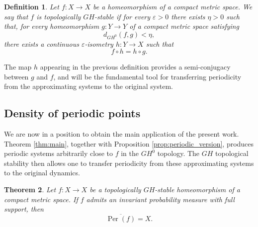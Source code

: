 \documentclass{amsart}
\numberwithin{equation}{section}
\newtheorem{theorem}{Theorem}[section]
\newtheorem{definition}[theorem]{Definition}
\theoremstyle{remark}
\DeclareMathOperator{\Per}{Per}
\begin{document}
\begin{definition}
Let $f:X\to X$ be a homeomorphism of a compact metric space. We say that $f$ is \emph{topologically $GH$-stable} if for every $\varepsilon>0$ there exists $\eta>0$ such that, for every homeomorphism $g:Y\to Y$ of a compact metric space satisfying
\[
d_{GH^0}(f,g)<\eta,
\]
there exists a continuous $\varepsilon$-isometry $h:Y\to X$ such that
\[
f\circ h=h\circ g.
\]
\end{definition}

The map $h$ appearing in the previous definition provides a semi-conjugacy between $g$ and $f$, and will be the fundamental tool for transferring periodicity from the approximating systems to the original system.

\subsection{Density of periodic points}

We are now in a position to obtain the main application of the present work. Theorem \ref{thm:main}, together with Proposition \ref{prop:periodic_version}, produces periodic systems arbitrarily close to $f$ in the $GH^0$ topology. The $GH$ topological stability then allows one to transfer periodicity from these approximating systems to the original dynamics.

\begin{theorem}\label{thm:denseperiodic}
Let $f:X\to X$ be a topologically $GH$-stable homeomorphism of a compact metric space. If $f$ admits an invariant probability measure with full support, then
\[
\overline{\Per(f)}=X.
\]
\end{theorem}
\end{document}
